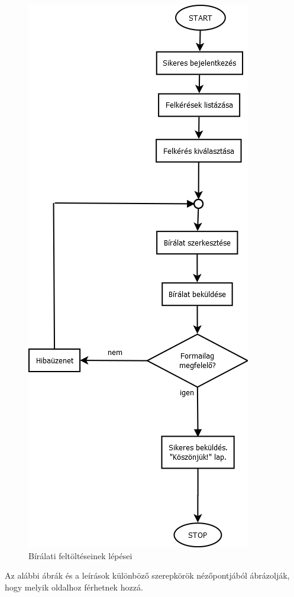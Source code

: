 \begin{figure}[h]
\centering
\includegraphics[scale=0.5]{images/Bírálat_feltöltése.png}
\caption{Bírálati feltöltéseinek lépései}
\label{fig:birala_feltoltese}
\end{figure}

\newpage


Az alábbi ábrák és a leírások különböző szerepkörök nézőpontjából ábrázolják, hogy melyik oldalhoz férhetnek hozzá.

